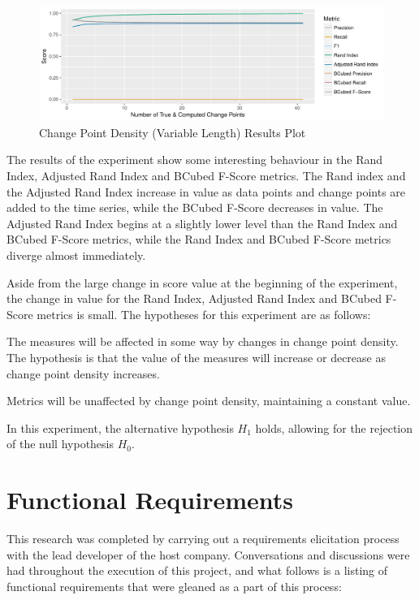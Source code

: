 \documentclass[../main.tex]{subfiles}
\begin{document}
\begin{figure}[H]
    \includegraphics[width=\textwidth]{figures/Experiment7}
    \caption{Change Point Density (Variable Length) Results Plot}
    \label{fig:Experiment8}
\end{figure}

The results of the experiment show some interesting behaviour in the Rand Index, Adjusted Rand Index and BCubed F-Score metrics. The Rand index and the Adjusted Rand Index increase in value as data points and change points are added to the time series, while the BCubed F-Score decreases in value. The Adjusted Rand Index begins at a slightly lower level than the Rand Index and BCubed F-Score metrics, while the Rand Index and BCubed F-Score metrics diverge almost immediately.

Aside from the large change in score value at the beginning of the experiment, the change in value for the Rand Index, Adjusted Rand Index and BCubed F-Score metrics is small. The hypotheses for this experiment are as follows:

\begin{hypothesis*}
    The measures will be affected in some way by changes in change point density. The hypothesis is that the value of the measures will increase or decrease as change point density increases.
\end{hypothesis*}

\begin{nullhypothesis*}
    Metrics will be unaffected by change point density, maintaining a constant value.
\end{nullhypothesis*}

In this experiment, the alternative hypothesis $H_1$ holds, allowing for the rejection of the null hypothesis $H_0$.

\section{Functional Requirements}

This research was completed by carrying out a requirements elicitation process with the lead developer of the host company. Conversations and discussions were had throughout the execution of this project, and what follows is a listing of functional requirements that were gleaned as a part of this process:
\end{document}
